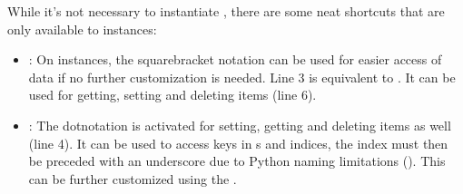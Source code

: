 \documentclass[a4paper,10pt,english]{sphinxmanual}
\begin{document}
\sphinxAtStartPar
While it’s not necessary to instantiate , there are some neat shortcuts that are only available to \sphinxhyphen{}instances:

\begin{sphinxVerbatim}[commandchars=\\\{\},numbers=left,firstnumber=1,stepnumber=1]
  
\PYG{p}{[}\PYG{p}{]}    
  
 \PYG{p}{[}  \PYG{p}{]}  
\end{sphinxVerbatim}
\begin{itemize}
\item {}
\sphinxAtStartPar
{}: On \sphinxhyphen{}instances, the square\sphinxhyphen{}bracket notation can be used for easier access of data if no further customization is needed. Line 3 is equivalent to . It can be used for getting, setting and deleting items (line 6).

\item {}
\sphinxAtStartPar
{}: The dot\sphinxhyphen{}notation is activated for setting, getting and deleting items as well (line 4). It can be used to access \sphinxhyphen{}keys in s and \sphinxhyphen{}indices, the index must then be preceded with an underscore due to Python naming limitations (). This can be further customized using the {\hyperref[\detokenize{README:path_split}]{\emph{}}} {\hyperref[\detokenize{README:fagus-options}]{\emph{}}}.

\end{itemize}
\end{document}
